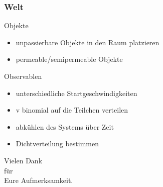 \documentclass[11pt]{beamer}
\begin{document}
\begin{frame}
  \frametitle{Welt}
    \vspace*{-0.3cm}
  \begin{block}{Objekte}
    \begin{itemize} 
      \item unpassierbare Objekte in den Raum platzieren
      \item permeable/semipermeable Objekte
    \end{itemize}
  \end{block}
    \pause
  \begin{block}{Observablen}
    \begin{itemize} 
      \item unterschiedliche Startgeschwindigkeiten
      \item v binomial auf die Teilchen verteilen
      \item abkühlen des Systems über Zeit
      \item Dichtverteilung bestimmen
    \end{itemize}
  \end{block}
\end{frame}

\begin{frame}
    \vspace*{0.9cm}
    \centering
    \Huge
    Vielen Dank\\
    für\\
    Eure Aufmerksamkeit.\\
\end{frame}
\end{document}
